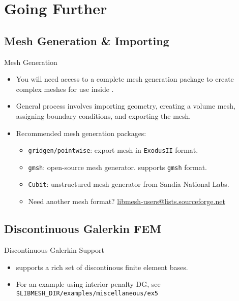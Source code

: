 \section{Going Further}

\subsection{Mesh Generation \& Importing}
\frame
{
  \begin{block}{Mesh Generation}
    \begin{itemize}
      \item You will need access to a complete mesh generation package to create complex meshes for use inside \libMesh{}.
      \item General process involves importing geometry, creating a volume mesh, assigning boundary conditions, and exporting the mesh.
      \item Recommended mesh generation packages:
        \begin{itemize}
          \item \texttt{gridgen/pointwise}: export mesh in \texttt{ExodusII} format.
          \item \texttt{gmsh}: open-source mesh generator. \libMesh{} supports \texttt{gmsh} format.
          \item \texttt{Cubit}: unstructured mesh generator from Sandia National Labs.
          \item Need another mesh format? \url{libmesh-users@lists.sourceforge.net}
        \end{itemize}
    \end{itemize}
  \end{block}
}


\subsection{Discontinuous Galerkin FEM}
\frame
{
  \begin{block}{Discontinuous Galerkin Support}
    \begin{itemize}
      \item \libMesh{} supports a rich set of discontinous finite element bases.
      \item For an example using interior penalty DG, see \texttt{\$LIBMESH\_DIR/examples/miscellaneous/ex5}
    \end{itemize}
  \end{block}
}

